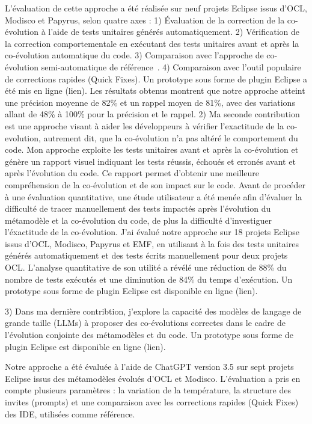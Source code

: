 L'évaluation de cette approche a été réalisée sur neuf projets Eclipse issus d'OCL, Modisco et Papyrus, selon quatre axes :
1) Évaluation de la correction de la co-évolution à l’aide de tests unitaires générés automatiquement.
2) Vérification de la correction comportementale en exécutant des tests unitaires avant et après la co-évolution automatique du code.
3) Comparaison avec l’approche de co-évolution semi-automatique de référence~\cite{Khelladi2020}.
4) Comparaison avec l’outil populaire de corrections rapides (Quick Fixes).
Un prototype sous forme de plugin Eclipse a été mis en ligne (lien). Les résultats obtenus montrent que notre approche atteint une précision moyenne de 82\% et un rappel moyen de 81\%, avec des variations allant de 48\% à 100\% pour la précision et le rappel.
2) Ma seconde contribution est une approche visant à aider les développeurs à vérifier l'exactitude de la co-evolution, autrement dit, que la co-évolution n'a pas altéré le comportement du code. Mon approche exploite les tests unitaires avant et après la co-évolution et génère un rapport visuel indiquant les tests réussis, échoués et erronés avant et après l’évolution du code. Ce rapport permet d’obtenir une meilleure compréhension de la co-évolution et de son impact sur le code.
Avant de procéder à une évaluation quantitative, une étude utilisateur a été menée afin d’évaluer la difficulté de tracer manuellement des tests impactés après l’évolution du métamodèle et la co-évolution du code, de plus la difficulté d'investiguer l'éxactitude de la co-évolution.
J'ai évalué notre approche sur 18 projets Eclipse issus d’OCL, Modisco, Papyrus et EMF, en utilisant à la fois des tests unitaires générés automatiquement et des tests écrits manuellement pour deux projets OCL. L’analyse quantitative de son utilité a révélé une réduction de 88\% du nombre de tests exécutés et une diminution de 84\% du temps d’exécution. Un prototype sous forme de plugin Eclipse est disponible en ligne (lien).



3) Dans ma dernière contribtion, j'explore la capacité des modèles de langage de grande taille (LLMs) à proposer des co-évolutions correctes dans le cadre de l’évolution conjointe des métamodèles et du code. Un prototype sous forme de plugin Eclipse est disponible en ligne (lien).

Notre approche a été évaluée à l’aide de ChatGPT version 3.5 sur sept projets Eclipse issus des métamodèles évolués d’OCL et Modisco. L’évaluation a pris en compte plusieurs paramètres : la variation de la température, la structure des invites (prompts) et une comparaison avec les corrections rapides (Quick Fixes) des IDE, utilisées comme référence.


